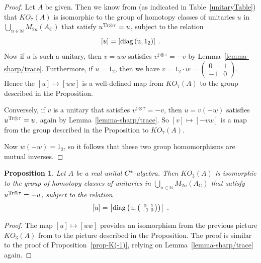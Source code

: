 \documentclass[12pt, reqno]{amsart}
\newtheorem{prop}[thm]{Proposition}
\theoremstyle{definition}
\def\C{{\mathbb C}}
\def\N{{\mathbb N}}
\def\1{{1}}
\def\Ttau{ ^{\rm{Tr} \otimes \tau}}
\def\stau{^{\sharp \otimes \tau}}
\def\diag{\rm{diag}}
\newcommand{\sm}[4]
	{ \left( \begin{smallmatrix} {#1} & {#2} \\ {#3} & {#4} \end{smallmatrix} \right)  }
\begin{document}
\begin{proof}
Let $A$ be given. Then we know from \cite{BL} (as indicated in Table~\ref{unitaryTable}) that $KO_{7}(A)$ is isomorphic to the group of homotopy classes of unitaries $u$ in 
$\bigcup_{n \in \N} M_{2n}(A_\C)$ that satisfy $u\Ttau = u$, subject to the relation
$$[u] = \left[ \diag\left(u, 1_2\right) \right] \; .$$
Now if $u$ is such a unitary, then $v = uw$ satisfies $v\stau = -v$ by Lemma~\ref{lemma-sharp/trace}. Furthermore, if $u = 1_2$, then we have $v = 1_2 \cdot w = \sm{0}{\1}{-\1}{0}$. Hence the $[u] \mapsto [uw]$ is a well-defined map from $KO_{7}(A)$ to the group described in the Proposition.

Conversely, if $v$ is a unitary that satisfies $v\stau = -v$, then $u = v(-w)$ satisfies $u \Ttau = u$, again by Lemma~\ref{lemma-sharp/trace}. So $[v] \mapsto [-vw]$ is a map from the group described in the Proposition to $KO_{7}(A)$.

Now $w(-w) = 1_2$, so it follows that these two group homomorphisms are mutual inverses.
\end{proof}

\begin{prop} \label{prop-K(3)}
Let $A$ be a real unital $C \sp *$-algebra. Then $KO_{3}(A)$ is isomorphic to the group of homotopy classes of unitaries in 
$\bigcup_{n \in \N} M_{2n}(A_\C)$ that satisfy $u\Ttau = -u$, subject to the relation
$$[u] = \left[ \diag\left(u,\sm{0}{\1}{-\1}{0} \right) \right] \; .$$
\end{prop}

\begin{proof}
The map $[u] \mapsto [uw]$ provides an isomorphism from the previous picture $KO_3(A)$ from \cite{BL} to the picture described in the Proposition. The proof is similar to the proof of Proposition~\ref{prop-K(-1)}, relying on Lemma~\ref{lemma-sharp/trace} again.
\end{proof}

\vspace{2cm}



\end{document}

